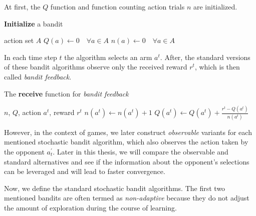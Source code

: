 \documentclass[../main.tex]{subfiles}
\begin{document}
At first, the $Q$ function and function counting action trials $n$ are initialized.
\begin{algorithm}
    \caption{\textbf{Initialize} a bandit}
    \label{bandit:stochastic:init}
    \begin{algorithmic}[1]
        \Require action set $A$
        \State $Q(a) \leftarrow 0 \quad \forall a \in A$
        \State $n(a) \leftarrow 0 \quad \forall a \in A$
    \end{algorithmic}
\end{algorithm}

In each time step $t$ the algorithm selects an arm $a^t$.
After, the standard versions of these bandit algorithms observe only the received reward $r^t$, which is then called \textit{bandit feedback}.
\begin{algorithm}[ht]
    \caption{The \textbf{receive} function for \textit{bandit feedback}}
    \label{bandit:stochastic:receive}
    \begin{algorithmic}[1]
        \Require $n$, $Q$, action $a^t$, reward $r^t$
        \State $n(a^t) \leftarrow n(a^t) + 1$
        \State $Q(a^t) \leftarrow Q(a^t) + \frac{r^t - Q(a^t)}{n(a^t)}$
    \end{algorithmic}
\end{algorithm}
However, in the context of games, we later construct \textit{observable} variants  for each mentioned stochastic bandit algorithm, which also observes the action taken by the opponent $a^{\prime}_{t}$.
Later in this thesis, we will compare the observable and standard alternatives and see if the information about the opponent's selections can be leveraged and will lead to faster convergence.

Now, we define the standard stochastic bandit algorithms.
The first two mentioned bandits are often termed as \textit{non-adaptive} because they do not adjust the amount of exploration during the course of learning.
\end{document}
